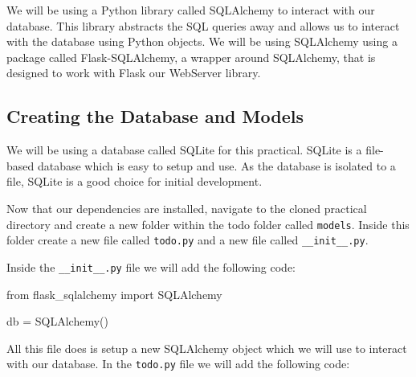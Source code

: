 \documentclass{csse4400}
\begin{document}
We will be using a Python library called SQLAlchemy to interact with our database.
This library abstracts the SQL queries away and allows us to interact with the database using Python objects.
We will be using SQLAlchemy using a package called Flask-SQLAlchemy, a wrapper around SQLAlchemy,
that is designed to work with Flask our WebServer library.


\subsection{Creating the Database and Models}

We will be using a database called SQLite for this practical.
SQLite is a file-based database which is easy to setup and use.
As the database is isolated to a file, SQLite is a good choice for initial development.

Now that our dependencies are installed,
navigate to the cloned practical directory and create a new folder within the todo folder called \texttt{models}.
Inside this folder create a new file called \texttt{todo.py} and a new file called \texttt{\_\_init\_\_.py}.

Inside the \texttt{\_\_init\_\_.py} file we will add the following code:

\begin{code}[language=python,numbers=none]{}
  from flask_sqlalchemy import SQLAlchemy

  db = SQLAlchemy()
\end{code}

All this file does is setup a new SQLAlchemy object which we will use to interact with our database.
In the \texttt{todo.py} file we will add the following code:
\end{document}
